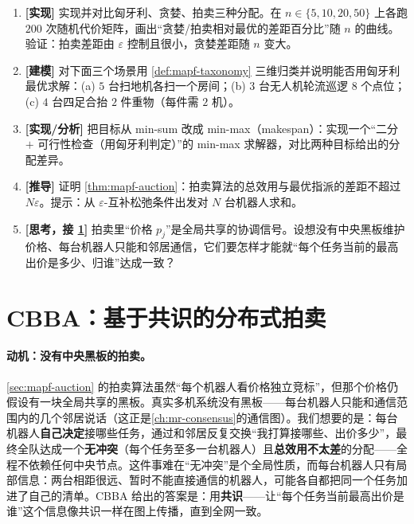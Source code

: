 \begin{exercise}
\begin{enumerate}
  \item \textbf{[实现]} 实现并对比匈牙利、贪婪、拍卖三种分配。在 $n\in\{5,10,20,50\}$ 上各跑 $200$ 次随机代价矩阵，画出“贪婪/拍卖相对最优的差距百分比”随 $n$ 的曲线。验证：拍卖差距由 $\varepsilon$ 控制且很小，贪婪差距随 $n$ 变大。
  \item \textbf{[建模]} 对下面三个场景用 \cref{def:mapf-taxonomy} 三维归类并说明能否用匈牙利最优求解：(a) $5$ 台扫地机各扫一个房间；(b) $3$ 台无人机轮流巡逻 $8$ 个点位；(c) $4$ 台四足合抬 $2$ 件重物（每件需 $2$ 机）。
  \item \textbf{[实现/分析]} 把目标从 min-sum 改成 min-max（makespan）：实现一个“二分 $+$ 可行性检查（用匈牙利判定）”的 min-max 求解器，对比两种目标给出的分配差异。
  \item \textbf{[推导]} 证明 \cref{thm:mapf-auction}：拍卖算法的总效用与最优指派的差距不超过 $N\varepsilon$。提示：从 $\varepsilon$-互补松弛条件出发对 $N$ 台机器人求和。
  \item \textbf{[思考，接 \cref{sec:mapf-cbba}]} 拍卖里“价格 $p_j$”是全局共享的协调信号。设想没有中央黑板维护价格、每台机器人只能和邻居通信，它们要怎样才能就“每个任务当前的最高出价是多少、归谁”达成一致？
\end{enumerate}
\end{exercise}

\section{CBBA：基于共识的分布式拍卖}
\label{sec:mapf-cbba}

\paragraph{动机：没有中央黑板的拍卖。}
\cref{sec:mapf-auction} 的拍卖算法虽然“每个机器人看价格独立竞标”，但那个价格仍假设有一块全局共享的黑板。真实多机系统没有黑板——每台机器人只能和通信范围内的几个邻居说话（这正是\cref{ch:mr-consensus}的通信图）。我们想要的是：每台机器人\textbf{自己决定}接哪些任务，通过和邻居反复交换“我打算接哪些、出价多少”，最终全队达成一个\textbf{无冲突}（每个任务至多一台机器人）且\textbf{总效用不太差}的分配——全程不依赖任何中央节点。这件事难在“无冲突”是个全局性质，而每台机器人只有局部信息：两台相距很远、暂时不能直接通信的机器人，可能各自都把同一个任务加进了自己的清单。CBBA 给出的答案是：用\textbf{共识}——让“每个任务当前最高出价是谁”这个信息像共识一样在图上传播，直到全网一致。

